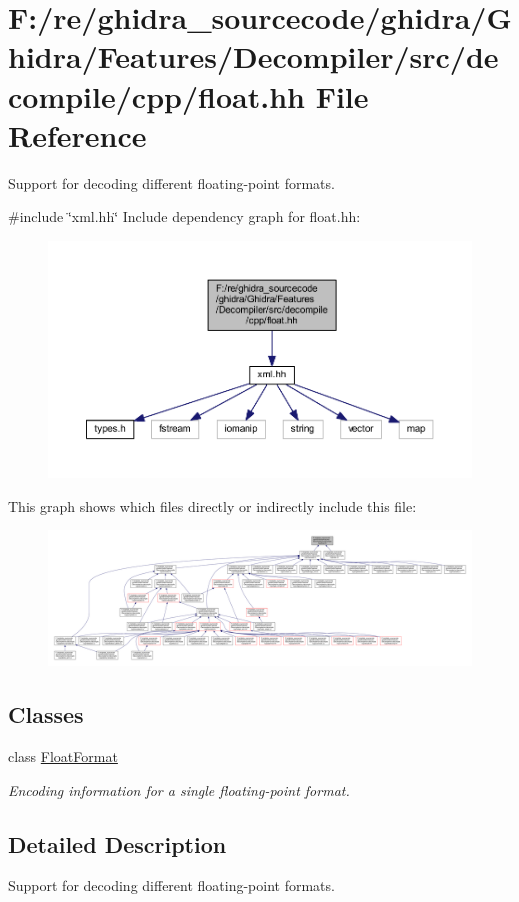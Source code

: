 \hypertarget{float_8hh}{}\section{F\+:/re/ghidra\+\_\+sourcecode/ghidra/\+Ghidra/\+Features/\+Decompiler/src/decompile/cpp/float.hh File Reference}
\label{float_8hh}


Support for decoding different floating-\/point formats.  


{\ttfamily \#include \char`\"{}xml.\+hh\char`\"{}}\newline
Include dependency graph for float.\+hh\+:
\nopagebreak
\begin{figure}[H]
\begin{center}
\leavevmode
\includegraphics[width=350pt]{float_8hh__incl}
\end{center}
\end{figure}
This graph shows which files directly or indirectly include this file\+:
\nopagebreak
\begin{figure}[H]
\begin{center}
\leavevmode
\includegraphics[width=350pt]{float_8hh__dep__incl}
\end{center}
\end{figure}
\subsection*{Classes}
\begin{DoxyCompactItemize}
\item 
class \mbox{\hyperlink{class_float_format}{Float\+Format}}
\begin{DoxyCompactList}\small\item\em Encoding information for a single floating-\/point format. \end{DoxyCompactList}\end{DoxyCompactItemize}


\subsection{Detailed Description}
Support for decoding different floating-\/point formats. 

